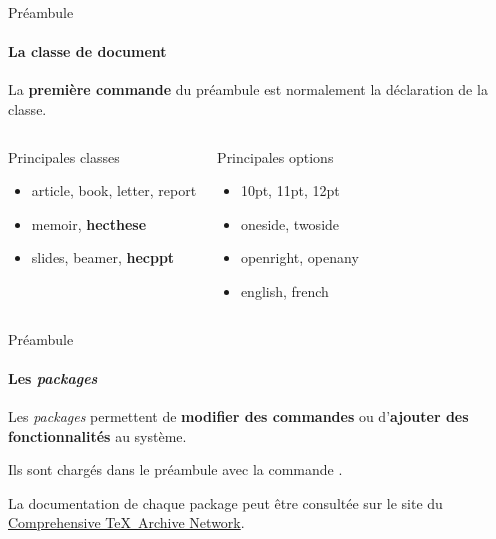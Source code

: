 \begin{frame}[fragile]{Préambule}
	\framesubtitle{La classe de document}
	La \textbf{première commande} du préambule est normalement la déclaration de la classe.
	

	\begin{columns}
		
		\pause
		
		\begin{HECcomparaison}{Principales classes}
			\begin{itemize}
				\item article, book, letter, report
				\item memoir, \textbf{hecthese}
				\item slides, beamer, \textbf{hecppt}
			\end{itemize}
		\end{HECcomparaison}
	
		\pause
		
		\begin{HECcomparaison}{Principales options}
			\begin{itemize}
				\item 10pt, 11pt, 12pt
				\item oneside, twoside
				\item openright, openany
				\item english, french
			\end{itemize}
		\end{HECcomparaison}
	\end{columns}
\end{frame}

\begin{frame}[fragile,c]{Préambule}
	\framesubtitle{Les \emph{packages}}
	Les \emph{packages} permettent de \textbf{modifier des commandes} ou d’\textbf{ajouter des fonctionnalités} au système.
	
	Ils sont chargés dans le préambule avec la commande .
	

	La documentation de chaque package peut être consultée sur le site du
	\href{https://ctan.org/}{Comprehensive \TeX\ Archive Network}.
\end{frame}

